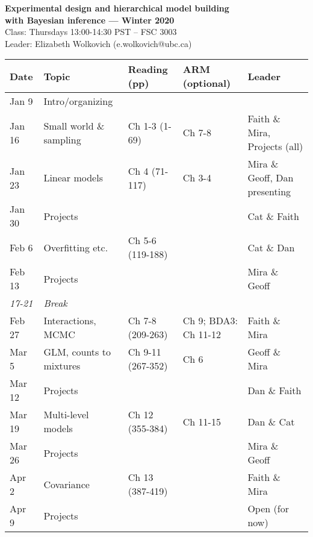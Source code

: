 \documentclass[11pt]{article}
\renewcommand{\baselinestretch}{1.20}
\begin{document}
 
\begin{center} {\large \textbf{Experimental design and hierarchical model building \\ with Bayesian inference --- Winter 2020}}\\ [10pt] %
Class: Thursdays 13:00-14:30 PST -- FSC 3003  \\ 
Leader: Elizabeth Wolkovich (e.wolkovich@ubc.ca) \\
\end{center} 
\renewcommand{\baselinestretch}{1.10}

\begin{center}
\begin{tabular}{p{1.2cm} p{3.5cm}  p{3.5cm}  p{2.5cm}  p{3cm} }
   \textbf{Date}
   & \textbf{Topic}
      & \textbf{Reading (pp)}
        & \textbf{ARM (optional)}
         & \textbf{Leader}  \\ 
\hline \hline
Jan 9  & Intro/organizing &           &    & \\ %
Jan 16 & Small world \& sampling       &     Ch 1-3  (1-69)  & Ch 7-8 & Faith \& Mira, Projects (all) \\ %
Jan 23 &  Linear models        &       Ch 4 (71-117) & Ch 3-4  & Mira \&  Geoff, Dan presenting\\ 
Jan 30 & Projects & & & Cat \& Faith\\
Feb 6  & Overfitting etc.      &   Ch 5-6 (119-188)\footnotemark[1] & & Cat \& Dan  \\ %
Feb 13 & Projects & & & Mira \& Geoff \\
\emph{17-21}  &    \emph{Break}     &               &        & \\
Feb 27   & Interactions, MCMC &  Ch 7-8 (209-263) & Ch 9; BDA3: Ch 11-12&  Faith \& Mira\\ %
Mar 5   & GLM, counts to mixtures               &    Ch 9-11 (267-352) & Ch 6 & Geoff \& Mira \\ %
Mar 12 & Projects & & &  Dan \& Faith\\
Mar 19  & Multi-level models          &  Ch 12 (355-384)    &  Ch 11-15   & Dan \& Cat \\
Mar 26 & Projects & & & Mira \& Geoff \\
Apr 2  & Covariance &        Ch 13 (387-419)   & & Faith \& Mira \\ %
Apr 9 & Projects & & & Open (for now) \\
\hline
\end{tabular}
\end{center}
\end{document}
